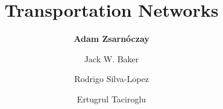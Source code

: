 %
%
%


%
%
%
%
%
%
%
%

\title{Transportation Networks}
\author{
    \textbf{Adam Zsarnóczay}
    \and Jack W. Baker
    \and Rodrigo Silva-Lopez
    \and Ertugrul Taciroglu}
\tocauthor{}
%
%
\maketitle

